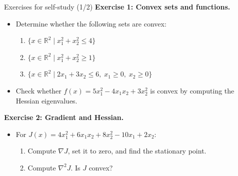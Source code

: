 \documentclass[aspectratio=169,10pt]{beamer}
\newcommand{\R}{\mathbb{R}}
\begin{document}
\begin{frame}{Exercises for self-study (1/2)}
\textbf{Exercise 1: Convex sets and functions.}
\begin{itemize}
  \item Determine whether the following sets are convex:
    \begin{enumerate}
      \item $\{x \in \R^2 \mid x_1^2 + x_2^2 \le 4\}$
      \item $\{x \in \R^2 \mid x_1^2 + x_2^2 \ge 1\}$
      \item $\{x \in \R^2 \mid 2x_1 + 3x_2 \le 6,\; x_1 \ge 0,\; x_2 \ge 0\}$
    \end{enumerate}
  \item Check whether $f(x) = 5x_1^2 - 4x_1 x_2 + 3x_2^2$ is convex by computing the Hessian eigenvalues.
\end{itemize}

\vspace{0.5em}
\textbf{Exercise 2: Gradient and Hessian.}
\begin{itemize}
  \item For $J(x) = 4x_1^2 + 6x_1 x_2 + 8x_2^2 - 10x_1 + 2x_2$:
  \begin{enumerate}
    \item Compute $\nabla J$, set it to zero, and find the stationary point.
    \item Compute $\nabla^2 J$. Is $J$ convex?
  \end{enumerate}
\end{itemize}
\end{frame}
\end{document}
